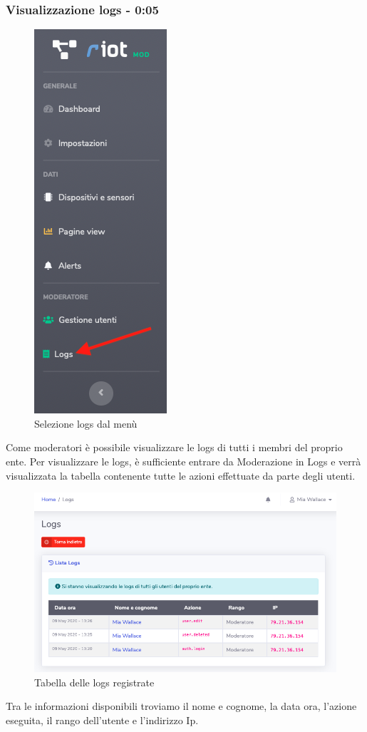 	\subsubsection{Visualizzazione logs - 0:05}
		\begin{figure}[H]
		\centering
		\includegraphics[scale=0.600]{res/images/mod/menuLogs.png}
		\caption{Selezione logs dal menù}
	\end{figure}
		Come moderatori è possibile visualizzare le logs di tutti i membri del proprio ente.
		Per visualizzare le logs, è sufficiente entrare da Moderazione in Logs e verrà visualizzata la tabella contenente tutte le azioni effettuate da parte degli utenti.
		\begin{figure}[H]
		\centering
		\includegraphics[scale=0.600]{res/images/mod/visLogs.png}
		\caption{Tabella delle logs registrate}
	\end{figure}
		Tra le informazioni disponibili troviamo il nome e cognome, la data ora, l’azione eseguita, il rango dell’utente e l’indirizzo Ip. 

